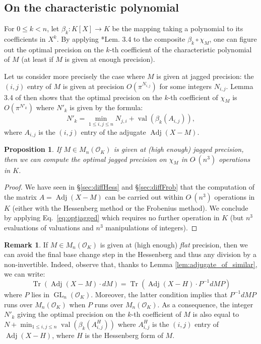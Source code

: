 \documentclass[sigconf]{acmart}
\DeclareMathOperator{\GL}{GL}
\DeclareMathOperator{\val}{val}
\DeclareMathOperator{\tr}{Tr}
\DeclareMathOperator{\adj}{Adj}
\newcommand{\OK}{\mathcal{O}_K}
\newcommand{\softO}{O\tilde{~}}
\newtheorem{prop}[theo]{Proposition}
\theoremstyle{definition}
\newtheorem{rem}[theo]{Remark}
\begin{document}
\subsection{On the characteristic polynomial}

For $0 \leq k < n$, let $\beta_k : K[X] \to K$ be the mapping taking a 
polynomial to its coefficients in $X^k$. By applying 
\cite{caruso-roe-vaccon:14a}*{Lem. 3.4} to the composite $\beta_k 
\circ \chi_M$, one can figure out the optimal precision on the
$k$-th coefficient of the characteristic polynomial of $M$ (at
least if $M$ is given at enough precision).

Let us consider more precisely the case where $M$ is given at 
jagged precision: the $(i,j)$ entry of $M$ is given at precision 
$O(\pi^{N_{i,j}})$ for some integers $N_{i,j}$. 
Lemma 3.4 of \cite{caruso-roe-vaccon:14a} then shows that
the optimal precision on the $k$-th coefficient of $\chi_M$ is 
$O(\pi^{N'_k})$ where $N'_k$ is given by the formula:
\begin{equation}
\label{eq:optjagged}
N'_k = \min_{1 \leq i, j\leq n} N_{j,i} + \val(\beta_k(A_{i,j})),
\end{equation}
where $A_{i,j}$ is the $(i,j)$ entry of the adjugate $\adj(X{-}M)$.

\begin{prop} \label{prop:optimal_jagged}
If $M \in M_n(\OK)$ is given at (high enough) jagged precision, 
then we can compute the optimal jagged precision on $\chi_M$ in 
$\softO (n^3)$ operations in $K$.
\end{prop}

\begin{proof}
We have seen in \S \ref{sec:diffHess} and \S \ref{sec:diffFrob}
that the computation of the matrix $A = \adj(X{-}M)$ can be carried out 
within $\softO(n^3)$ operations in $K$ (either with the Hessenberg 
method or the Frobenius method). We conclude by applying 
Eq.~\eqref{eq:optjagged} which requires no further operation in $K$
(but $n^3$ evaluations of valuations and $n^3$ manipulations of 
integers).
\end{proof}

\begin{rem}
If $M \in M_n(\OK)$ is given at (high enough) \emph{flat} precision, 
then we can avoid the final base change step in the Hessenberg 
and thus any division by a non-invertible.
Indeed, observe that, thanks to Lemma \ref{lem:adjugate_of_similar}, 
we can write:
$$\tr(\adj (X{-}M) \cdot dM)=\tr(\adj (X{-}H)\cdot P^{-1} dM P)$$
where $P$ lies in $\GL_n(\OK)$. Moreover, the latter condition implies
that $P^{-1} dM P$ runs over $M_n(\OK)$ when $P$ runs over $M_n(\OK)$.
As a consequence, the integer $N'_k$ giving the optimal precision on the 
$k$-th coefficient of $M$ is also equal to
$N + \min_{1 \leq i, j\leq n} \val(\beta_k(A^H_{i,j}))$
where $A^H_{i,j}$ is the $(i,j)$ entry of $\adj(X{-}H)$,
where $H$ is the Hessenberg form of $M$.
\end{rem}
\end{document}
